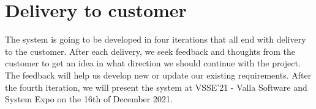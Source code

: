 \section{Delivery to customer}

The system is going to be developed in four iterations that all end with delivery to the customer. After each delivery, we seek feedback and thoughts from the customer to get an idea in what direction we should continue with the project. The feedback will help us develop new or update our existing requirements. After the fourth iteration, we will present the system at VSSE'21 - Valla Software and System Expo on the 16th of December 2021.  